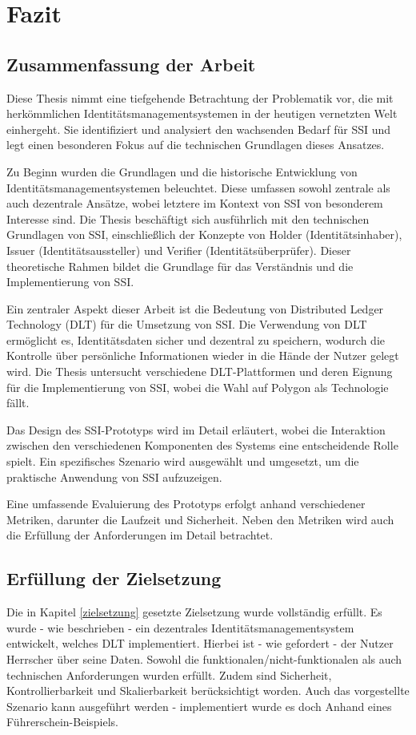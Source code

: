 \chapter{Fazit}
\label{cha:fazit}

\section{Zusammenfassung der Arbeit}
Diese Thesis nimmt eine tiefgehende Betrachtung der Problematik vor, die mit herkömmlichen Identitätsmanagementsystemen in der heutigen vernetzten Welt einhergeht. Sie identifiziert und analysiert den wachsenden Bedarf für SSI und legt einen besonderen Fokus auf die technischen Grundlagen dieses Ansatzes.

Zu Beginn wurden die Grundlagen und die historische Entwicklung von Identitätsmanagementsystemen beleuchtet. Diese umfassen sowohl zentrale als auch dezentrale Ansätze, wobei letztere im Kontext von SSI von besonderem Interesse sind. Die Thesis beschäftigt sich ausführlich mit den technischen Grundlagen von SSI, einschließlich der Konzepte von Holder (Identitätsinhaber), Issuer (Identitätsaussteller) und Verifier (Identitätsüberprüfer). Dieser theoretische Rahmen bildet die Grundlage für das Verständnis und die Implementierung von SSI.

Ein zentraler Aspekt dieser Arbeit ist die Bedeutung von Distributed Ledger Technology (DLT) für die Umsetzung von SSI. Die Verwendung von DLT ermöglicht es, Identitätsdaten sicher und dezentral zu speichern, wodurch die Kontrolle über persönliche Informationen wieder in die Hände der Nutzer gelegt wird. Die Thesis untersucht verschiedene DLT-Plattformen und deren Eignung für die Implementierung von SSI, wobei die Wahl auf Polygon als Technologie fällt.

Das Design des SSI-Prototyps wird im Detail erläutert, wobei die Interaktion zwischen den verschiedenen Komponenten des Systems eine entscheidende Rolle spielt. Ein spezifisches Szenario wird ausgewählt und umgesetzt, um die praktische Anwendung von SSI aufzuzeigen.

Eine umfassende Evaluierung des Prototyps erfolgt anhand verschiedener Metriken, darunter die Laufzeit und Sicherheit. Neben den Metriken wird auch die Erfüllung der Anforderungen im Detail betrachtet.

\section{Erfüllung der Zielsetzung}
Die in Kapitel \ref{zielsetzung} gesetzte Zielsetzung  wurde vollständig erfüllt. Es wurde - wie beschrieben - ein dezentrales Identitätsmanagementsystem entwickelt, welches DLT implementiert. Hierbei ist - wie gefordert - der Nutzer Herrscher über seine Daten. Sowohl die funktionalen/nicht-funktionalen als auch technischen Anforderungen wurden erfüllt. Zudem sind Sicherheit, Kontrollierbarkeit und Skalierbarkeit berücksichtigt worden. Auch das vorgestellte Szenario kann ausgeführt werden - implementiert wurde es doch Anhand eines Führerschein-Beispiels.


